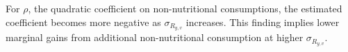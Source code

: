 For $\rho$, the quadratic coefficient on non-nutritional consumptions, the estimated coefficient becomes more negative as $\sigma_{R_{y,v}}$ increases. This finding implies lower marginal gains from additional non-nutritional consumption at higher $\sigma_{R_{y,v}}$.

\clearpage
\pagebreak


\begingroup
{}
\setlength\bibitemsep{0pt}
\printbibliography[title=References for Online Appendix]
\endgroup
\pagebreak
